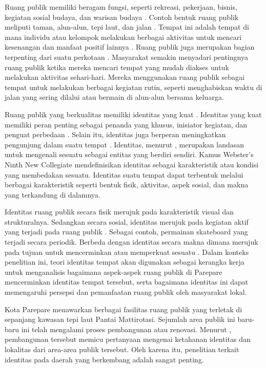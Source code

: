 \documentclass[11pt]{simart} %
\begin{document}
Ruang publik memiliki beragam fungsi, seperti rekreasi, pekerjaan, bisnis, kegiatan sosial budaya, dan warisan budaya \citep{hajmirsadeghi2012}. Contoh bentuk ruang publik meliputi taman, alun-alun, tepi laut, dan jalan \citep{hajmirsadeghi2012}. Tempat ini adalah tempat di mana individu atau kelompok melakukan berbagai aktivitas untuk mencari kesenangan dan manfaat positif lainnya \citep{hajmirsadeghi2012}.
Ruang publik juga merupakan bagian terpenting dari suatu perkotaan \citep{dong2004}. Masyarakat semakin menyadari pentingnya ruang publik ketika mereka mencari tempat yang mudah diakses untuk melakukan aktivitas sehari-hari. Mereka menggunakan ruang publik sebagai tempat untuk melakukan berbagai kegiatan rutin, seperti menghabiskan waktu di jalan yang sering dilalui atau bermain di alun-alun bersama keluarga.

Ruang publik yang berkualitas memiliki identitas yang kuat \citep{hartanti2014}.
Identitas yang kuat memiliki peran penting sebagai penanda yang khusus, inisiator kegiatan, dan penguat perbedaan \citep{hartanti2014}. Selain itu, identitas juga berperan meningkatkan pengunjung dalam suatu tempat \citep{oktay2002}. Identitas, menurut \cite{hartanti2014}, merupakan landasan untuk mengenali sesuatu sebagai entitas yang berdiri sendiri. Kamus Webster’s Ninth New Collegiate mendefinisikan identitas sebagai karakteristik atau kondisi yang membedakan sesuatu. Identitas suatu tempat dapat terbentuk melalui berbagai karakteristik seperti bentuk fisik, aktivitas, aspek sosial, dan makna yang terkandung di dalamnya.

Identitas ruang publik secara fisik merujuk pada karakteristik visual dan strukturalnya.
Sedangkan secara sosial, identitas merujuk pada kegiatan aktif yang terjadi pada ruang publik \citep{al2023}. Sebagai contoh, permainan skateboard yang terjadi secara periodik. Berbeda dengan identitas secara makna dimana merujuk pada tujuan untuk mencerminkan atau memperkuat sesuatu \citep{sari2024}.
Dalam konteks penelitian ini, teori identitas tempat akan digunakan sebagai kerangka kerja untuk menganalisis bagaimana aspek-aspek ruang publik di Parepare mencerminkan identitas tempat tersebut, serta bagaimana identitas ini dapat memengaruhi persepsi dan pemanfaatan ruang publik oleh masyarakat lokal.

Kota Parepare menawarkan berbagai fasilitas ruang publik yang terletak di sepanjang kawasan tepi laut Pantai Mattirotasi. Sejumlah area publik ini baru-baru ini telah mengalami proses pembangunan atau renovasi. Menurut \cite{kaymaz2013}, pembangunan tersebut memicu pertanyaan mengenai ketahanan identitas dan lokalitas dari area-area publik tersebut. Oleh karena itu, penelitian terkait identitas pada daerah yang berkembang adalah sangat penting.
\end{document}
